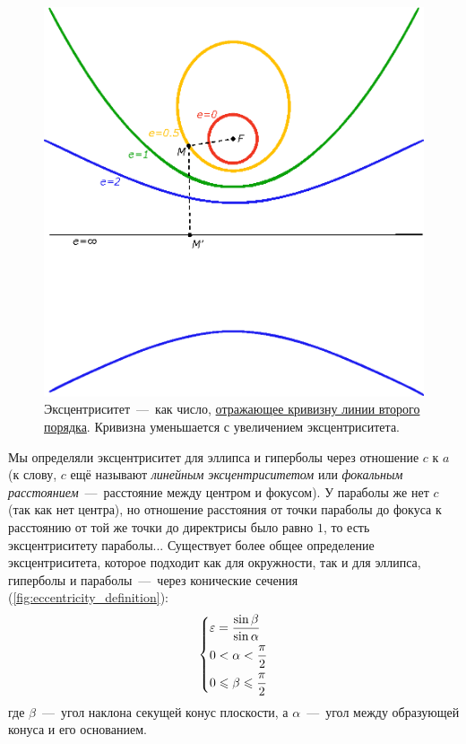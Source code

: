 \documentclass[a4paper,12pt]{article}
\begin{document}
  \begin{figure}[h]
    \centering
    
    \begin{minipage}[c]{0.4\textwidth}  %
      \includegraphics[width=\textwidth]{eccentricity}
    \end{minipage}\hfill
    \begin{minipage}[c]{0.55\textwidth}
      \caption{Эксцентриситет~---~как число, \href{https://en.wikipedia.org/wiki/Conic_section}{отражающее кривизну линии второго порядка}. Кривизна уменьшается с увеличением эксцентриситета.}
      \label{fig:eccentricity}
    \end{minipage}
  \end{figure}
  
  
  Мы определяли эксцентриситет для эллипса и гиперболы через отношение $c$ к $a$ (к слову,  $c$ ещё называют \emph{линейным эксцентриситетом} или \emph{фокальным расстоянием}~---~расстояние между центром и фокусом).
  У параболы же нет $c$ (так как нет центра), но отношение расстояния от точки параболы до фокуса к расстоянию от той же точки до директрисы было равно $1$, то есть эксцентриситету параболы...
  Существует более общее определение эксцентриситета, которое подходит как для окружности, так и для эллипса, гиперболы и параболы~---~через конические сечения (\ref{fig:eccentricity_definition}):
  \[
    \left\{
      \begin{aligned}
        &\varepsilon = \frac{\sin \beta}{\sin \alpha}\\
        &0 < \alpha < \frac{\pi}{2}\\
        &0 \leqslant \beta \leqslant \frac{\pi}{2}
      \end{aligned}
    \right.
  \]
  где $\beta$~---~угол наклона секущей конус плоскости, а $\alpha$~---~угол между образующей конуса и его основанием.
  
\end{document}
